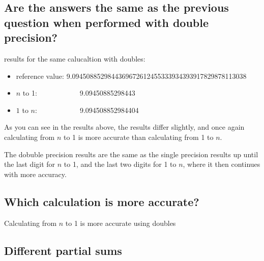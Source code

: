 \documentclass[12pt]{article}
\begin{document}
\subsection*{Are the answers the same as the previous question when performed with double precision?}
\item results for the same calucaltion with doubles:
\begin{itemize}
\item reference value:  9.0945088529844369672612455333934393917829878113038
\item $n$ to 1:\ \ \ \ \ \ \ \ \ \ \ \ 9.09450885298443
\item $1$ to $n$:\ \ \ \ \ \ \ \ \ \ \ \ 9.094508852984404
\end{itemize}
\item As you can see in the results above, the results differ slightly, and once again calculating from $n$ to 1 is more accurate than calculating from 1 to $n$.
\item The dobuble precision results are the same as the single precision results up until the last digit for $n$ to 1, and the last two digits for 1 to $n$, where it then continues with more accuracy.
\begin{itemize}
\subsection*{Which calculation is more accurate?}
\end{itemize}
\item Calculating from $n$ to 1 is more accurate using doubles
\begin{itemize}
\break
\subsection*{Different partial sums}
\end{itemize}
\end{document}
